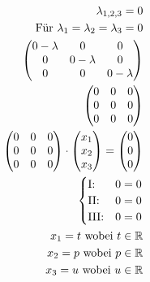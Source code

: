 \begin{align*}
    \lambda_{1, 2, 3} = 0                                                  \\
    \text{Für } \lambda_1 = \lambda_2 = \lambda_3 = 0                      \\
    \begin{pmatrix}
        0 - \lambda & 0           & 0           \\
        0           & 0 - \lambda & 0           \\
        0           & 0           & 0 - \lambda
    \end{pmatrix}                                \\
    \begin{pmatrix}
        0 & 0 & 0 \\
        0 & 0 & 0 \\
        0 & 0 & 0
    \end{pmatrix}                                                         \\
    \begin{pmatrix}
        0 & 0 & 0 \\
        0 & 0 & 0 \\
        0 & 0 & 0
    \end{pmatrix} \cdot \begin{pmatrix}
                            x_1 \\ x_2 \\ x_3
                        \end{pmatrix} = \begin{pmatrix}
                                            0 \\ 0 \\ 0
                                        \end{pmatrix}                     \\
    \begin{cases}
        \text{I:\@}   & 0 = 0 \\
        \text{II:\@}  & 0 = 0 \\
        \text{III:\@} & 0 = 0
    \end{cases}                                                  \\
    x_1 = t \text{ wobei } t \in \mathbb{R}                                \\
    x_2 = p \text{ wobei } p \in \mathbb{R}                                \\
    x_3 = u \text{ wobei } u \in \mathbb{R}                                \\

\end{align*}
